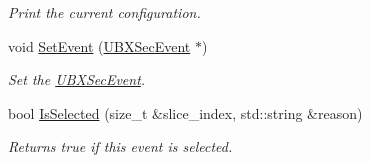 \begin{DoxyCompactItemize}
\begin{DoxyCompactList}\small\item\em Print the current configuration. \end{DoxyCompactList}\item 
\hypertarget{classubana_1_1NuMuCCEventSelection_aab2612c63b22127e3d3909c8fdd8b9b7}{void \hyperlink{classubana_1_1NuMuCCEventSelection_aab2612c63b22127e3d3909c8fdd8b9b7}{Set\-Event} (\hyperlink{classUBXSecEvent}{U\-B\-X\-Sec\-Event} $\ast$)}\label{classubana_1_1NuMuCCEventSelection_aab2612c63b22127e3d3909c8fdd8b9b7}

\begin{DoxyCompactList}\small\item\em Set the \hyperlink{classUBXSecEvent}{U\-B\-X\-Sec\-Event}. \end{DoxyCompactList}\item 
\hypertarget{classubana_1_1NuMuCCEventSelection_ae460bec72d7b1ccee24968868df4af26}{bool \hyperlink{classubana_1_1NuMuCCEventSelection_ae460bec72d7b1ccee24968868df4af26}{Is\-Selected} (size\-\_\-t \&slice\-\_\-index, std\-::string \&reason)}\label{classubana_1_1NuMuCCEventSelection_ae460bec72d7b1ccee24968868df4af26}

\begin{DoxyCompactList}\small\item\em Returns true if this event is selected. \end{DoxyCompactList}\end{DoxyCompactItemize}
